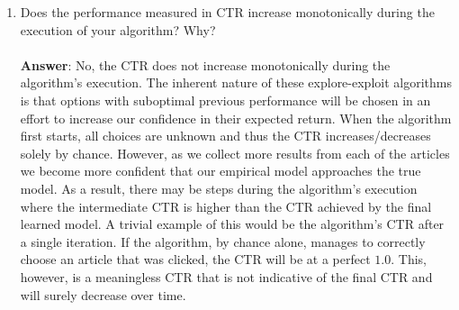 \documentclass[11pt]{article}
\begin{document}
\begin{enumerate}
\item Does the performance measured in CTR increase monotonically during the
execution of your algorithm? Why? \\ \\
\textbf{Answer}: No, the CTR does not increase monotonically during the
algorithm's execution.  The inherent nature of these explore-exploit algorithms
is that options with suboptimal previous performance will be chosen in an effort
to increase our confidence in their expected return.  When the algorithm first
starts, all choices are unknown and thus the CTR increases/decreases solely by
chance.  However, as we collect more results from each of the articles we become
more confident that our empirical model approaches the true model.  As a result,
there may be steps during the algorithm's execution where the intermediate CTR
is higher than the CTR achieved by the final learned model.  A trivial example
of this would be the algorithm's CTR after a single iteration.  If the
algorithm, by chance alone, manages to correctly choose an article that was
clicked, the CTR will be at a perfect $1.0$.  This, however, is a meaningless
CTR that is not indicative of the final CTR and will surely decrease over time.

\end{enumerate}
\end{document}
